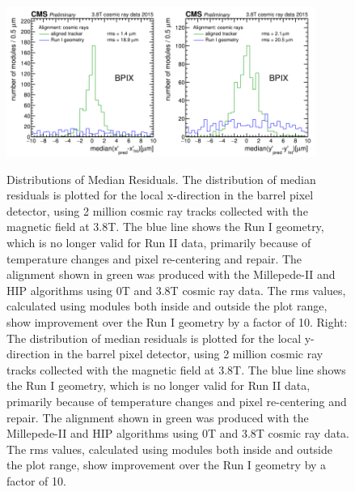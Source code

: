 \begin{figure}[htb] 
    \begin{center}
        \includegraphics[width=0.45\textwidth]{../figs/Alignment/AlRes_CRAFT_DmedianR_BPIX_plain.png}\includegraphics[width=0.45\textwidth]{../figs/Alignment/AlRes_CRAFT_DmedianYR_BPIX_plain.png}
    \end{center}
    \caption {Distributions of Median Residuals. The distribution of median residuals is plotted for the local x-direction in the barrel pixel detector, using 2 million cosmic ray tracks collected with the magnetic field at 3.8T. The blue line shows the Run I geometry, which is no longer valid for Run II data, primarily because of temperature changes and pixel re-centering and repair. The alignment shown in green was produced with the Millepede-II and HIP algorithms using 0T and 3.8T cosmic ray data. The rms values, calculated using modules both inside and outside the plot range, show improvement over the Run I geometry by a factor of 10. Right: The distribution of median residuals is plotted for the local y-direction in the barrel pixel detector, using 2 million cosmic ray tracks collected with the magnetic field at 3.8T. The blue line shows the Run I geometry, which is no longer valid for Run II data, primarily because of temperature changes and pixel re-centering and repair. The alignment shown in green was produced with the Millepede-II and HIP algorithms using 0T and 3.8T cosmic ray data. The rms values, calculated using modules both inside and outside the plot range, show improvement over the Run I geometry by a factor of 10. }
    \label{fig:DMRs}
\end{figure}

